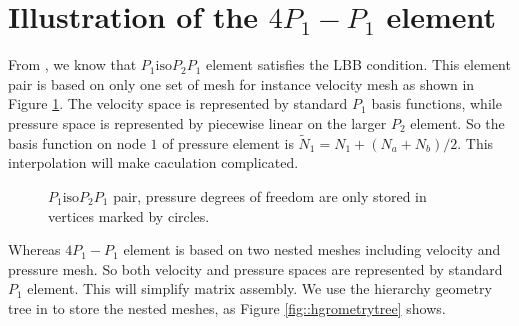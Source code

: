 \documentclass[mathpazo]{aamm}
\begin{document}
\section{Illustration of the $4P_1-P_1$ element}
\label{sec3} From \cite{bercovier1979error}, we know that
   $P_1\text{iso}P_2P_1$ element satisfies the LBB condition. This
   element pair is based on only one set of mesh for instance velocity mesh
   as shown in Figure \ref{fig::p1isop2p1}. The velocity space is represented
   by standard $P_1$ basis 
   functions, while pressure space is represented by piecewise linear on the larger 
   $P_2$ element. So the basis function on node $1$ of pressure
   element is $\tilde{N}_1 = N_1 + (N_a + N_b)/2$. This
   interpolation will make caculation complicated.  
   \begin{figure}
     \centering
     \caption{$P_1\text{iso}P_2P_1$ pair, pressure degrees of
       freedom are only stored in vertices marked by circles.}
     \label{fig::p1isop2p1}
   \end{figure}  
   Whereas $4P_1-P_1$ element is based on two nested
   meshes including velocity and pressure mesh. So both velocity and
   pressure spaces are represented by standard $P_1$ element. This 
   will simplify matrix assembly. We use the hierarchy geometry tree in 
   \cite{li2005multi} to store the nested meshes, as Figure
   \ref{fig::hgrometrytree} shows.
 
\end{document}
